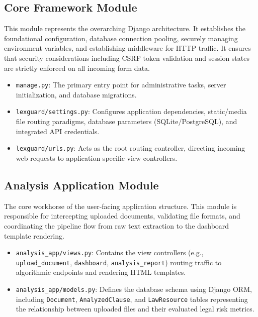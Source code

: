\documentclass[a4paper,12pt]{report}
\begin{document}
\subsection{Core Framework Module}
This module represents the overarching Django architecture. It establishes the foundational configuration, database connection pooling, securely managing environment variables, and establishing middleware for HTTP traffic. It ensures that security considerations including CSRF token validation and session states are strictly enforced on all incoming form data.
\begin{itemize}
    \item \texttt{manage.py}: The primary entry point for administrative tasks, server initialization, and database migrations.
    \item \texttt{lexguard/settings.py}: Configures application dependencies, static/media file routing paradigms, database parameters (SQLite/PostgreSQL), and integrated API credentials.
    \item \texttt{lexguard/urls.py}: Acts as the root routing controller, directing incoming web requests to application-specific view controllers.
\end{itemize}

\subsection{Analysis Application Module}
The core workhorse of the user-facing application structure. This module is responsible for intercepting uploaded documents, validating file formats, and coordinating the pipeline flow from raw text extraction to the dashboard template rendering.
\begin{itemize}
    \item \texttt{analysis\_app/views.py}: Contains the view controllers (e.g., \texttt{upload\_document}, \texttt{dashboard}, \texttt{analysis\_report}) routing traffic to algorithmic endpoints and rendering HTML templates.
    \item \texttt{analysis\_app/models.py}: Defines the database schema using Django ORM, including \texttt{Document}, \texttt{AnalyzedClause}, and \texttt{LawResource} tables representing the relationship between uploaded files and their evaluated legal risk metrics.
\end{itemize}
\end{document}
